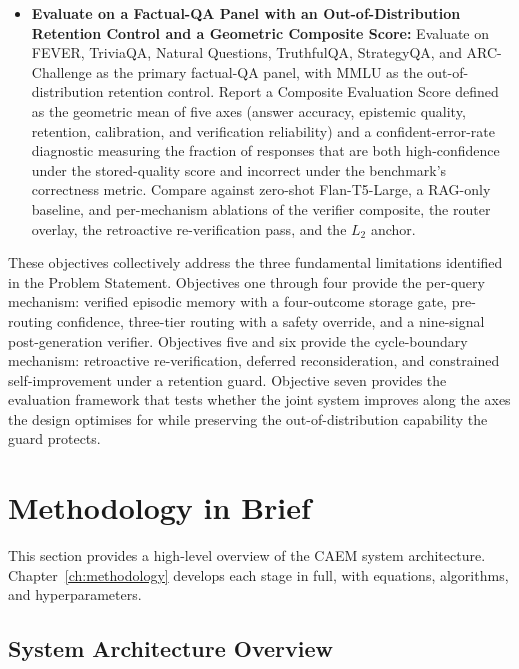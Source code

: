 \begin{itemize}
    \item \textbf{Evaluate on a Factual-QA Panel with an Out-of-Distribution Retention Control and a Geometric Composite Score:} Evaluate on FEVER, TriviaQA, Natural Questions, TruthfulQA, StrategyQA, and ARC-Challenge as the primary factual-QA panel, with MMLU as the out-of-distribution retention control. Report a Composite Evaluation Score defined as the geometric mean of five axes (answer accuracy, epistemic quality, retention, calibration, and verification reliability) and a confident-error-rate diagnostic measuring the fraction of responses that are both high-confidence under the stored-quality score and incorrect under the benchmark's correctness metric. Compare against zero-shot Flan-T5-Large, a RAG-only baseline, and per-mechanism ablations of the verifier composite, the router overlay, the retroactive re-verification pass, and the $L_2$ anchor.
\end{itemize}

These objectives collectively address the three fundamental limitations identified in the Problem Statement. Objectives one through four provide the per-query mechanism: verified episodic memory with a four-outcome storage gate, pre-routing confidence, three-tier routing with a safety override, and a nine-signal post-generation verifier. Objectives five and six provide the cycle-boundary mechanism: retroactive re-verification, deferred reconsideration, and constrained self-improvement under a retention guard. Objective seven provides the evaluation framework that tests whether the joint system improves along the axes the design optimises for while preserving the out-of-distribution capability the guard protects.

\section{Methodology in Brief}

This section provides a high-level overview of the CAEM system architecture. Chapter~\ref{ch:methodology} develops each stage in full, with equations, algorithms, and hyperparameters.

\subsection{System Architecture Overview}

